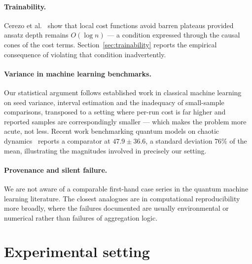 \documentclass[11pt,onecolumn]{article}
\newif\ifdraft
\newcommand{\pend}[1]{%
  \ifdraft\textcolor{PendFG}{\textbf{[}\textit{#1}\textbf{]}}\fi}
\newcommand{\pendpara}[1]{%
  \ifdraft\par\vspace{2pt}\noindent
  \fcolorbox{PendFG}{PendBG}{\begin{minipage}{0.97\linewidth}\small
    \textcolor{PendFG}{\textbf{PENDING.} #1}\end{minipage}}\par\vspace{4pt}\fi}
\begin{document}
\paragraph{Trainability.}
Cerezo et al.~\cite{cerezo2021} show that local cost functions avoid
barren plateaus provided ansatz depth remains $O(\log n)$ --- a
condition expressed through the causal cones of the cost terms.
Section~\ref{sec:trainability} reports the empirical consequence of
violating that condition inadvertently.

\paragraph{Variance in machine learning benchmarks.}
Our statistical argument follows established work in classical machine
learning~\cite{henderson2018,agarwal2021,bouthillier2021,dodge2019} on
seed variance, interval estimation and the inadequacy of small-sample
comparisons, transposed to a setting where per-run cost is far higher
and reported samples are correspondingly smaller --- which makes the
problem more acute, not less. Recent work benchmarking quantum models on
chaotic dynamics~\cite{pandey2026} reports a comparator at
$47.9 \pm 36.6$, a standard deviation $76\%$ of the mean, illustrating
the magnitudes involved in precisely our setting.

\paragraph{Provenance and silent failure.}
We are not aware of a comparable first-hand case series in the quantum
machine learning literature. The closest analogues are in computational
reproducibility more broadly, where the failures documented are usually
environmental or numerical rather than failures of aggregation logic.
\pend{search for prior art on aggregation-key errors in ML pipelines;
if a comparable account exists, contribution 6 weakens}

\pendpara{Exact citations, years and venues for
\cite{henderson2018,agarwal2021,bouthillier2021,dodge2019,pandey2026};
author list for \cite{qasa}; journal volume and page for
\cite{schuld2021}. Also outstanding: a search for any quantum machine
learning paper that reports seed dispersion and derives a required
sample size. If one exists, contribution 1 weakens.}

\section{Experimental setting}\label{sec:setting}
\end{document}
